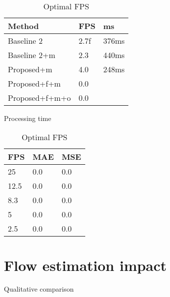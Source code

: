 \begin{table}[!htb]
\begin{minipage}{.5\linewidth}
\centering
\begin{tabular}{lll}
\hline
Method                             & FPS & ms \\ \hline
\multicolumn{1}{l|}{Baseline 2}    & 2.7f & 376ms \\
\multicolumn{1}{l|}{Baseline 2+m} & 2.3 & 440ms \\
\multicolumn{1}{l|}{Proposed+m}      & 4.0 & 248ms \\
\multicolumn{1}{l|}{Proposed+f+m} & 0.0 \\
\multicolumn{1}{l|}{Proposed+f+m+o} & 0.0 \\ \hline
\end{tabular}
\caption{\label{tab:fps_fudan}Processing time}
\end{minipage} %
\begin{minipage}{.5\linewidth}
\centering
\begin{tabular}{lll}
		\hline
		FPS                               & MAE & MSE \\ \hline
		\multicolumn{1}{l|}{25}          & 0.0 & 0.0 \\
		\multicolumn{1}{l|}{12.5}        & 0.0 & 0.0 \\
		\multicolumn{1}{l|}{8.3}        & 0.0 & 0.0 \\
		\multicolumn{1}{l|}{5}        & 0.0 & 0.0 \\
		\multicolumn{1}{l|}{2.5} & 0.0 & 0.0 \\ \hline
		\end{tabular}
\caption{\label{tab:fps_fudan} Optimal FPS}
\end{minipage}
\end{table}

\section{Flow estimation impact}
Qualitative comparison